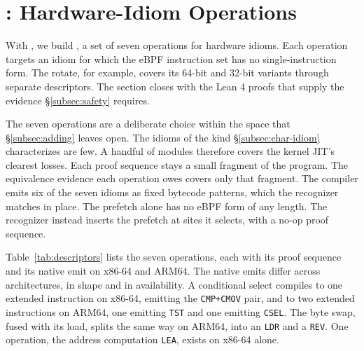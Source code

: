 \section{\lang: Hardware-Idiom Operations}
\label{sec:lang}

With \tool, we build \lang, a set of seven operations for hardware idioms.
Each operation targets an idiom for which the eBPF instruction set has no single-instruction form.
The rotate, for example, covers its 64-bit and 32-bit variants through separate descriptors.
The section closes with the Lean 4 proofs that supply the evidence \S\ref{subsec:safety} requires.

The seven operations are a deliberate choice within the space that \S\ref{subsec:adding} leaves open.
The idioms of the kind \S\ref{subsec:char-idiom} characterizes are few.
A handful of modules therefore covers the kernel JIT’s clearest losses.
Each proof sequence stays a small fragment of the program.
The equivalence evidence each operation owes covers only that fragment.
The compiler emits six of the seven idioms as fixed bytecode patterns, which the recognizer matches in place.
The prefetch alone has no eBPF form of any length.
The recognizer instead inserts the prefetch at sites it selects, with a no-op proof sequence.

Table~\ref{tab:descriptors} lists the seven operations, each with its proof sequence and its native emit on x86-64 and ARM64.
The native emits differ across architectures, in shape and in availability.
A conditional select compiles to one extended instruction on x86-64, emitting the \texttt{CMP+CMOV} pair, and to two extended instructions on ARM64, one emitting \texttt{TST} and one emitting \texttt{CSEL}.
The byte swap, fused with its load, splits the same way on ARM64, into an \texttt{LDR} and a \texttt{REV}.
One operation, the address computation \texttt{LEA}, exists on x86-64 alone.

